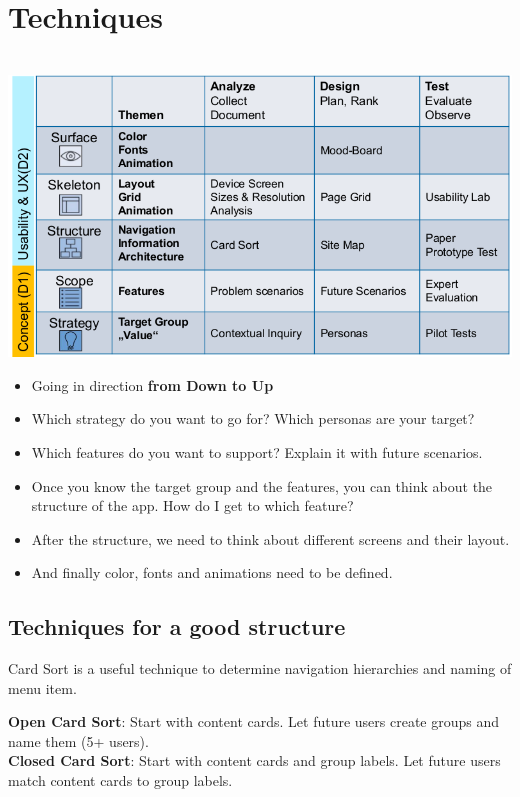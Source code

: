 \section{Techniques}

\begin{breakbox}
 \\
\includegraphics[width=.25\textwidth]{figures/ucdIssuesTechniques.png}
\end{breakbox}

\begin{breakbox}

\begin{itemize}
\item
  Going in direction \textbf{from Down to Up}
\item
  Which strategy do you want to go for? Which personas are your target?
\item
  Which features do you want to support? Explain it with future
  scenarios.
\item
  Once you know the target group and the features, you can think about
  the structure of the app. How do I get to which feature?
\item
  After the structure, we need to think about different screens and
  their layout.
\item
  And finally color, fonts and animations need to be defined.
\end{itemize}

\end{breakbox}

\subsection{Techniques for a good structure}

\begin{breakbox}

Card Sort is a useful technique to determine navigation hierarchies and
naming of menu item.

\textbf{Open Card Sort}: Start with content cards. Let future users
create groups and name them (5+ users).\\
\textbf{Closed Card Sort}: Start with content cards and group labels.
Let future users match content cards to group labels.

\end{breakbox}

